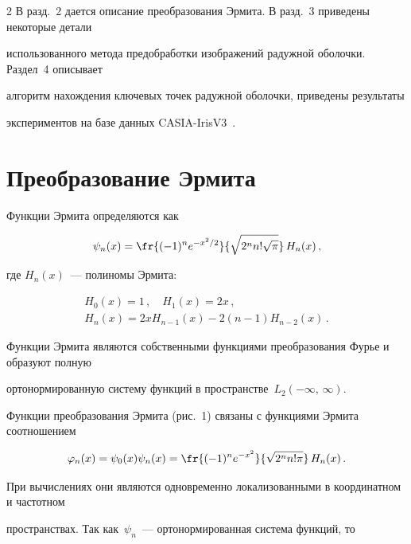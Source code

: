 \begin{multicols}{2}
В разд.~2 дается описание преобразования Эрмита. В разд.~3 приведены некоторые детали 


использованного метода предобработки изображений радужной оболочки. Раздел~4 описывает 


алгоритм нахождения ключевых точек радужной оболочки, приведены результаты 


экспериментов на базе данных CASIA-IrisV3~\cite{6pav}. 





\section{Преобразование Эрмита}





Функции Эрмита определяются как


$$


\psi_n (x) = \fr{(-1)^n e^{-x^2/2}}{\sqrt{2^n n!\sqrt{\pi}}}\,H_n(x)\,,


$$


где $H_n(x)$~--- полиномы Эрмита:


\begin{gather*}


H_0(x) =1\,,\quad H_1(x) =2x\,,\\


H_n(x) =2x H_{n-1}(x) -2(n-1)H_{n-2}(x)\,.


\end{gather*}


      


Функции Эрмита являются собственными функциями преобразования Фурье и образуют полную 


ортонормированную систему функций в пространстве~$L_2(-\infty,\,\infty)$. 





Функции преобразования Эрмита (рис.~1) связаны с функциями Эрмита соотношением


$$


\varphi_n(x) =\psi_0(x)\psi_n(x) =\fr{(-1)^n e^{-x^2}}{\sqrt{2^n n!\pi}}\,H_n(x)\,.


$$


При вычислениях они являются одновременно локализованными в координатном и частотном 


пространствах. Так как~$\psi_n$~--- ортонормированная сис\-те\-ма функций, то



\end{multicols}
